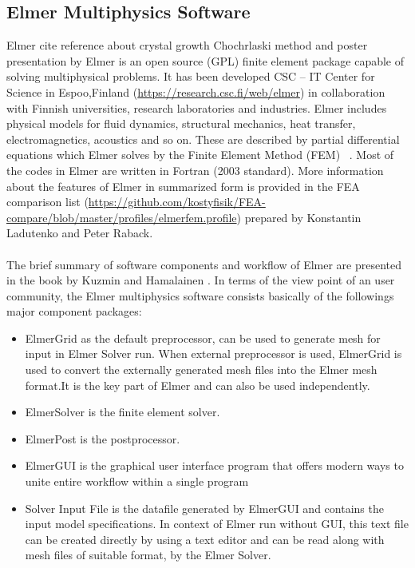 \subsection{Elmer Multiphysics Software}
Elmer cite reference about crystal growth Chochrlaski method \cite{VSavolainen2002} and poster presentation by 
\cite{PRaback2007}
Elmer is  an open source (GPL) finite element package capable of solving  multiphysical problems. It has been developed CSC – IT Center for Science in Espoo,Finland  (\url{https://research.csc.fi/web/elmer}) in collaboration with Finnish universities, research laboratories and industries. Elmer includes physical models for fluid dynamics, structural mechanics, heat transfer, electromagnetics, acoustics and so on. These are described by partial differential equations which Elmer solves by the Finite Element Method (FEM)~\cite{VSavolainen2002}\cite{PRaback2007}\cite{EJarvinen2008}
\cite{TSikanen2008}\cite{SAdhikari2012}\cite{HSeddik2012}. 
Most of the codes in Elmer are written in Fortran (2003 standard). More information about the features of Elmer in summarized form is provided in the FEA comparison list (\url{https://github.com/kostyfisik/FEA-compare/blob/master/profiles/elmerfem.profile}) prepared by Konstantin Ladutenko and Peter Raback.  
\paragraph*{}
The brief summary of software components and workflow of Elmer are presented in the book by Kuzmin and Hamalainen \cite{DKuzmin2014}.
In terms of the view point of an user community, the Elmer multiphysics software consists basically of the followings major component packages:
\begin{itemize}
\item ElmerGrid as  the default preprocessor, can be used to generate mesh for input in Elmer Solver run. When external preprocessor is used, ElmerGrid is used to convert the externally generated mesh files into the Elmer mesh format.It is the key part of Elmer and can also be used independently.
\item ElmerSolver is the finite element solver.
\item ElmerPost is the postprocessor.
\item ElmerGUI is the graphical user interface program that offers modern ways to unite entire workflow within a single program 
\item Solver Input File is the datafile generated by ElmerGUI and contains the input model specifications. In context of Elmer run without GUI, this text file can be created directly by using a text editor and can be read along with mesh files of suitable format, by the Elmer Solver.  
\end{itemize}

